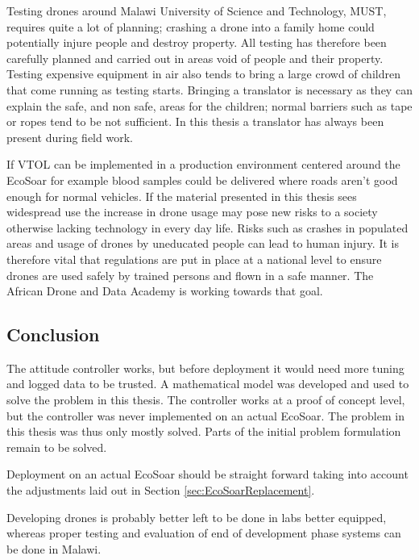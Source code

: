 \documentclass{article}
\begin{document}
Testing drones around Malawi University of Science and Technology, MUST, requires quite a lot of planning; crashing a drone into a family home could potentially injure people and destroy property.
All testing has therefore been carefully planned and carried out in areas void of people and their property.
Testing expensive equipment in air also tends to bring a large crowd of children that come running as testing starts.
Bringing a translator is necessary as they can explain the safe, and non safe, areas for the children; normal barriers such as tape or ropes tend to be not sufficient.
In this thesis a translator has always been present during field work.

If VTOL can be implemented in a production environment centered around the EcoSoar for example blood samples could be delivered where roads aren't good enough for normal vehicles.
If the material presented in this thesis sees widespread use the increase in drone usage may pose new risks to a society otherwise lacking technology in every day life.
Risks such as crashes in populated areas and usage of drones by uneducated people can lead to human injury.
It is therefore vital that regulations are put in place at a national level to ensure drones are used safely by trained persons and flown in a safe manner.
The African Drone and Data Academy is working towards that goal.


\subsection{Conclusion}
The attitude controller works, but before deployment it would need more tuning and logged data to be trusted.
A mathematical model was developed and used to solve the problem in this thesis.
The controller works at a proof of concept level, but the controller was never implemented on an actual EcoSoar.
The problem in this thesis was thus only mostly solved. 
Parts of the initial problem formulation remain to be solved.

Deployment on an actual EcoSoar should be straight forward taking into account the adjustments laid out in Section \ref{sec:EcoSoarReplacement}.

Developing drones is probably better left to be done in labs better equipped, whereas proper testing and evaluation of end of development phase systems can be done in Malawi.
\end{document}
